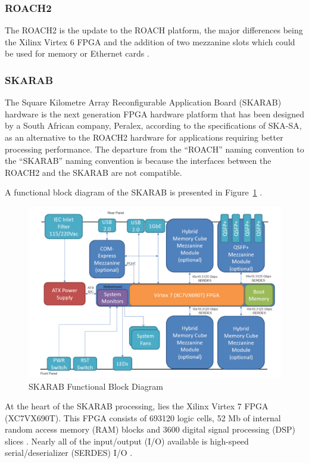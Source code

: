 \documentclass{ws-jai}
\begin{document}

\subsubsection{ROACH2}

The ROACH2 is the update to the ROACH platform, the major differences being the Xilinx Virtex 6 FPGA and the addition of two mezzanine slots which could be used for memory or Ethernet cards \cite{Casp12}.

\subsubsection{SKARAB}

The Square Kilometre Array Reconfigurable Application Board (SKARAB) hardware is the next generation FPGA hardware platform that has been designed by a South African company, Peralex, according to the specifications of SKA-SA, as an alternative to the ROACH2 hardware for applications requiring better processing performance. The departure from the ``ROACH'' naming convention to the ``SKARAB'' naming convention is because the interfaces between the ROACH2 and the SKARAB are not compatible.

A functional block diagram of the SKARAB is presented in Figure~\ref{fig:skarab_bd} \cite{cliff16}.

\begin{figure}[h]
\centering
\includegraphics[width=150mm, scale=0.5]{skarab_bd}
\caption{SKARAB Functional Block Diagram}
\label{fig:skarab_bd}
\end{figure}

At the heart of the SKARAB processing, lies the Xilinx Virtex 7 FPGA (XC7VX690T). This FPGA consists of 693120 logic cells, 52 Mb of internal random access memory (RAM) blocks and 3600 digital signal processing (DSP) slices \cite{cliff16}. Nearly all of the input/output (I/O) available is high-speed serial/deserializer (SERDES) I/O \cite{Teag15}.
\end{document}

